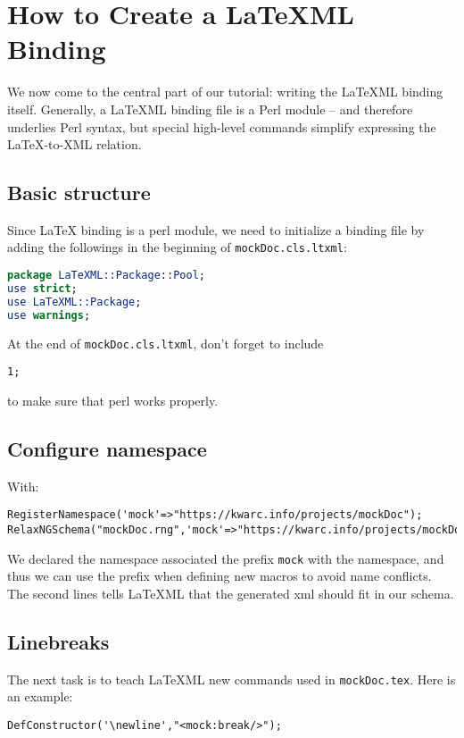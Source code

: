 \documentclass[a4paper]{article}
\def\latexml{{\LaTeX}ML\xspace}
\begin{document}
\section{How to Create a \latexml Binding}
We now come to the central part of our tutorial: writing the \latexml binding
itself. Generally, a \latexml binding file is a Perl module -- and therefore underlies
Perl syntax, but special high-level commands simplify expressing the {\LaTeX}-to-XML
relation.

\subsection{Basic structure}
Since {\LaTeX} binding is a perl module, we need to initialize a binding file by adding
the followings in the beginning of \lstinline|mockDoc.cls.ltxml|:
\begin{lstlisting}[language=Perl]
package LaTeXML::Package::Pool;
use strict;
use LaTeXML::Package;
use warnings;
\end{lstlisting}
At the end of \lstinline|mockDoc.cls.ltxml|, don't forget to include
\begin{lstlisting}
1;
\end{lstlisting}
to make sure that perl works properly.

\subsection{Configure namespace}
 With:
\begin{lstlisting}
RegisterNamespace('mock'=>"https://kwarc.info/projects/mockDoc");
RelaxNGSchema("mockDoc.rng",'mock'=>"https://kwarc.info/projects/mockDoc");
\end{lstlisting}
 We declared the namespace associated the prefix \lstinline|mock| with the
 namespace, and thus we can use the prefix when defining new macros to avoid 
 name conflicts. The second lines tells \latexml that the generated xml should fit in our
 schema.

\subsection{Linebreaks}
The next task is to teach \latexml new commands used in \lstinline|mockDoc.tex|. Here is
an example:
\begin{lstlisting}
DefConstructor('\newline',"<mock:break/>");
\end{lstlisting}
\end{document}
